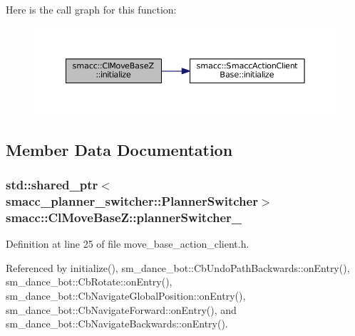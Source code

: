 Here is the call graph for this function\+:
\nopagebreak
\begin{figure}[H]
\begin{center}
\leavevmode
\includegraphics[width=350pt]{classsmacc_1_1ClMoveBaseZ_a0eb8e4a0e80456fa534bbef7b2e330a5_cgraph}
\end{center}
\end{figure}




\subsection{Member Data Documentation}
\subsubsection[{\texorpdfstring{planner\+Switcher\+\_\+}{plannerSwitcher_}}]{\setlength{\rightskip}{0pt plus 5cm}std\+::shared\+\_\+ptr$<${\bf smacc\+\_\+planner\+\_\+switcher\+::\+Planner\+Switcher}$>$ smacc\+::\+Cl\+Move\+Base\+Z\+::planner\+Switcher\+\_\+}\hypertarget{classsmacc_1_1ClMoveBaseZ_a1a20609e1b4a9406cd6cece0d74acfe5}{}\label{classsmacc_1_1ClMoveBaseZ_a1a20609e1b4a9406cd6cece0d74acfe5}


Definition at line 25 of file move\+\_\+base\+\_\+action\+\_\+client.\+h.



Referenced by initialize(), sm\+\_\+dance\+\_\+bot\+::\+Cb\+Undo\+Path\+Backwards\+::on\+Entry(), sm\+\_\+dance\+\_\+bot\+::\+Cb\+Rotate\+::on\+Entry(), sm\+\_\+dance\+\_\+bot\+::\+Cb\+Navigate\+Global\+Position\+::on\+Entry(), sm\+\_\+dance\+\_\+bot\+::\+Cb\+Navigate\+Forward\+::on\+Entry(), and sm\+\_\+dance\+\_\+bot\+::\+Cb\+Navigate\+Backwards\+::on\+Entry().

